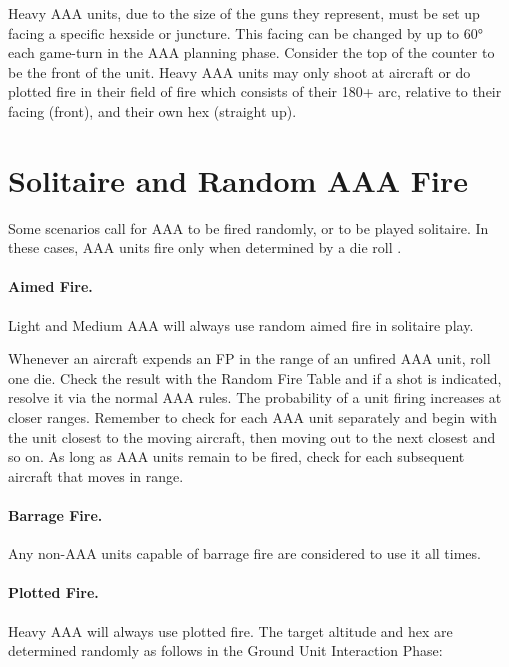 \begin{advancedrules}
Heavy AAA units, due to the size of the guns they represent, must be set up facing a specific hexside or juncture. This facing can be changed by up to 60° each game-turn in the AAA planning phase. Consider the top of the counter to be the front of the unit. Heavy AAA units may only shoot at aircraft or do plotted fire in their field of fire which consists of their 180+ arc, relative to their facing (front), and their own hex (straight up).

\section{Solitaire and Random AAA Fire}




Some scenarios call for AAA to be fired randomly, or to be played solitaire. In these cases, AAA units fire only when determined by a die roll .

\paragraph{Aimed Fire.} Light and Medium AAA will always use random aimed fire in solitaire play.

Whenever an aircraft expends an FP in the range of an unfired AAA unit, roll one die. Check the result with the Random Fire Table and if a shot is indicated, resolve it via the normal AAA rules. The probability of a unit firing increases at closer ranges. Remember to check for each AAA unit separately and begin with the unit closest to the moving aircraft, then moving out to the next closest and so on. As long as AAA units remain to be fired, check for each subsequent aircraft that moves in range.

\paragraph{Barrage Fire.} Any non-AAA units capable of barrage fire are considered to use it all times.

\paragraph{Plotted Fire.} Heavy AAA will always use plotted fire. The target altitude and hex are determined randomly as follows in the Ground Unit Interaction Phase:


\end{advancedrules}
